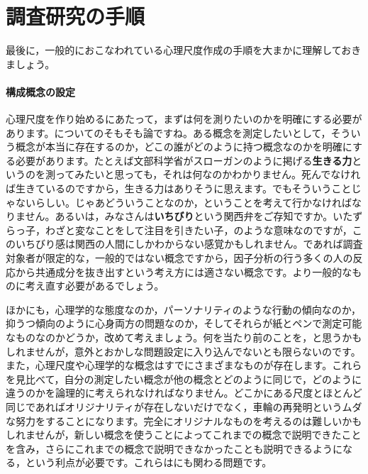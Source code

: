 \documentclass{ltjsbook}
\begin{document}
\section{調査研究の手順}
最後に，一般的におこなわれている心理尺度作成の手順を大まかに理解しておきましょう。

\paragraph{構成概念の設定}心理尺度を作り始めるにあたって，まずは何を測りたいのかを明確にする必要があります。についてのそもそも論ですね。ある概念を測定したいとして，そういう概念が本当に存在するのか，どこの誰がどのように持つ概念なのかを明確にする必要があります。たとえば文部科学省がスローガンのように掲げる\textbf{生きる力}というのを測ってみたいと思っても，それは何なのかわかりません。死んでなければ生きているのですから，生きる力はありそうに思えます。でもそういうことじゃないらしい。じゃあどういうことなのか，ということを考えて行かなければなりません。あるいは，みなさんは\textbf{いちびり}という関西弁をご存知ですか。いたずらっ子，わざと変なことをして注目を引きたい子，のような意味なのですが，このいちびり感は関西の人間にしかわからない感覚かもしれません。であれば調査対象者が限定的な，一般的ではない概念ですから，因子分析の行う多くの人の反応から共通成分を抜き出すという考え方には適さない概念です。より一般的なものに考え直す必要があるでしょう。

ほかにも，心理学的な態度なのか，パーソナリティのような行動の傾向なのか，抑うつ傾向のように心身両方の問題なのか，そしてそれらが紙とペンで測定可能なものなのかどうか，改めて考えましょう。何を当たり前のことを，と思うかもしれませんが，意外とおかしな問題設定に入り込んでないとも限らないのです。また，心理尺度や心理学的な概念はすでにさまざまなものが存在します。これらを見比べて，自分の測定したい概念が他の概念とどのように同じで，どのように違うのかを論理的に考えられなければなりません。どこかにある尺度とほとんど同じであればオリジナリティが存在しないだけでなく，車輪の再発明というムダな努力をすることになります。完全にオリジナルなものを考えるのは難しいかもしれませんが，新しい概念を使うことによってこれまでの概念で説明できたことを含み，さらにこれまでの概念で説明できなかったことも説明できるようになる，という利点が必要です。これらはにも関わる問題です。
\end{document}
